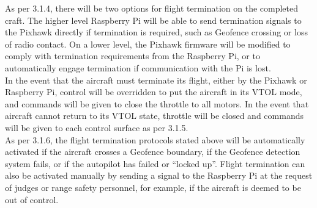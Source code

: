As per 3.1.4, there will be two options for flight termination on the completed craft. The higher level Raspberry Pi will be able to send termination signals to the Pixhawk directly if termination is required, such as Geofence crossing or loss of radio contact.  On a lower level, the Pixhawk firmware will be modified to comply with termination requirements from the Raspberry Pi, or to automatically engage termination if communication with the Pi is lost.\\

In the event that the aircraft must terminate its flight, either by the Pixhawk or Raspberry Pi, control will be overridden to put the aircraft in its VTOL mode, and commands will be given to close the throttle to all motors.
In the event that aircraft cannot return to its VTOL state, throttle will be closed and commands will be given to each control surface as per 3.1.5.\\

As per 3.1.6, the flight termination protocols stated above will be automatically activated if the aircraft crosses a Geofence boundary, if the Geofence detection system fails, or if the autopilot has failed or ``locked up''. Flight termination can also be activated manually by sending a signal to the Raspberry Pi at the request of judges or range safety personnel, for example, if the aircraft is deemed to be out of control.
